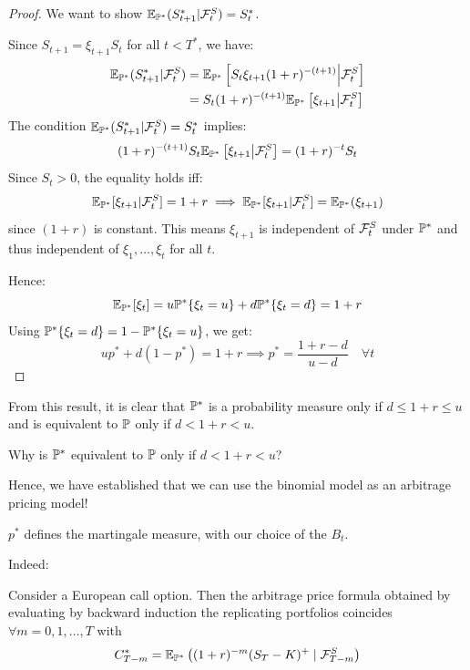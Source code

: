 \begin{proof}
    We want to show $\mathbb E_{\mathbb P^*}(S_{t+1}^* | \mathcal{F}_t^S) = S_t^*$.
    
    Since $S_{t+1} = \xi_{t+1} S_t$ for all $t < T^*$, we have:
    \begin{align*}
        \mathbb E_{\mathbb P^*}(S_{t+1}^* | \mathcal{F}_t^S) &= \mathbb E_{\mathbb P^*} \left[ S_t \xi_{t+1} (1+r)^{-(t+1)} \middle| \mathcal{F}_t^S \right] \\
        &= S_t (1+r)^{-(t+1)} \mathbb E_{\mathbb P^*} \left[ \xi_{t+1} \middle| \mathcal{F}_t^S \right]
    \end{align*}
    The condition $\mathbb E_{\mathbb P^*}(S_{t+1}^* | \mathcal{F}_t^S) = S_t^*$ implies:
    \[ (1+r)^{-(t+1)} S_t \mathbb E_{\mathbb P^*} \left[ \xi_{t+1} \middle| \mathcal{F}_t^S \right] = (1+r)^{-t} S_t \]
    Since $S_t > 0$, the equality holds iff:
    \[ \mathbb E_{\mathbb P^*}[\xi_{t+1} | \mathcal{F}_t^S] = 1+r \implies \mathbb E_{\mathbb P^*}[\xi_{t+1} | \mathcal{F}_t^S] = \mathbb E_{\mathbb P^*}(\xi_{t+1}) \]
    since $(1+r)$ is constant. This means $\xi_{t+1}$ is independent of $\mathcal{F}_t^S$ under $\mathbb P^*$ and thus independent of $\xi_1, \dots, \xi_t$ for all $t$.
    
    Hence:
    \[ \mathbb E_{\mathbb P^*}[\xi_t] = u \mathbb P^*\{\xi_t = u\} + d \mathbb P^*\{\xi_t = d\} = 1+r \]
    Using $\mathbb P^*\{\xi_t = d\} = 1 - \mathbb P^*\{\xi_t = u\}$, we get:
    \[ u p^* + d(1-p^*) = 1+r \implies p^* = \frac{1+r-d}{u-d} \quad \forall t \]
\end{proof}

\begin{remark}
    From this result, it is clear that $\mathbb P^*$ is a probability measure only if $d \leq 1+r \leq u$ and is equivalent to $\mathbb P$ only if $d < 1+r < u$.
\end{remark}

\begin{homework}
    Why is $\mathbb P^*$ equivalent to $\mathbb P$ only if $d < 1+r < u$?
\end{homework}

\begin{remark}
    Hence, we have established that we can use the binomial model as an arbitrage pricing model!
    
    $p^*$ defines the martingale measure, with our choice of the  $B_t$.
    
    Indeed:
\end{remark}

\begin{proposition}
    Consider a European call option. Then the arbitrage price formula obtained by evaluating by backward induction the replicating portfolios coincides $\forall m=0,1, \dots, T$ with
    \[ C_{T-m}^* = \mathbb E_{\mathbb P^*} \left( (1+r)^{-m} (S_T - K)^+ \mid \mathcal{F}_{T-m}^S \right) \]
\end{proposition}

